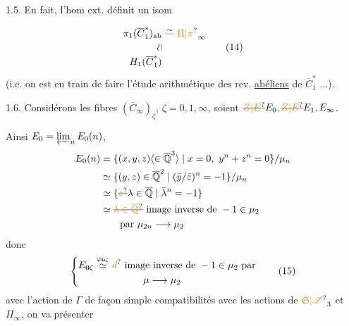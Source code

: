 1.5. En fait, l'hom ext.
définit un isom

\[
\begin{aligned}
\pi_1(\overline C_1^*)_{\mathrm{ab}}&\mathrel{\overset{\sim}{\text{---}}}\unsure{\Pi|\pi}_\infty\\
\rotatebox{90}{$\simeq$}&\\[-3pt]
H_1(\overline C_1^*)&
\end{aligned}\tag*{(14)}
\]
(i.e. on est en train de faire l'étude
arithmétique des rev.  \uline{abéliens} de
$\overline C_1^*$ ...).

1.6. Considérons les fibres
$(\overline C_\infty)_{\zeta}$, $\zeta=0,1,\infty$, soient
$\deleted{\unsure{Z|E}}E_0,\deleted{\unsure{Z|E}}E_1,E_\infty$.

Ainsi $E_0=\varprojlim_n E_0(n)$,
\[
\begin{aligned}
E_0(n)&=\{(x,y,z)\inserted{\in\overline{\mathbb Q}^3}\mid x=0,\ y^n+z^n=0\}/\mu_n\\
&\simeq\{(y,z)\in\overline{\mathbb Q}^2\mid(\bar y/\bar z)^n=-1\}/\mu_n\\
&\simeq\{\deleted{\unsure{z}}\lambda\in\overline{\mathbb Q}\mid\bar\lambda^n=-1\}\\
&\simeq\deleted{\unsure{\lambda\in\overline{\mathbb Q}}}\ \text{image inverse de }-1\in\mu_2\\
&\qquad\text{par }\mu_{2n}\longrightarrow\mu_2
\end{aligned}
\]
donc
\[
\left\{\begin{aligned}
E_{\deleted{0}\zeta}&\overset{\varphi_{\deleted{0}\zeta}}{\simeq}
\unsure{d}\ \text{image inverse de }-1\in\mu_2\text{ par}\\
&\hspace{5em}\mu\longrightarrow\mu_2
\end{aligned}\right.\tag*{(15)}
\]
avec l'action de  $\Gamma$ \unsure{;|,}
de façon simple  compatibilités avec
les actions de $\unsure{\mathfrak S|\mathscr S}_3$ et $\Pi_\infty$, on va présenter

